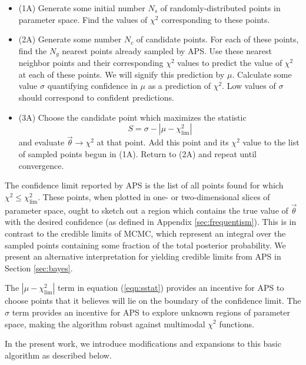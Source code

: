 \documentclass[useAMS,usenatbib]{aastex}
\begin{document}
\begin{itemize}
\item(1A) Generate some initial number $N_s$ of randomly-distributed points in 
parameter space.  Find the values of $\chi^2$ corresponding to these points.
\\
\item(2A) Generate some number $N_c$ of candidate points.  
For each of these points, find the $N_g$ nearest points already sampled
by APS. Use these nearest neighbor points and their corresponding $\chi^2$ values
to predict the value of $\chi^2$ at each of these points.
 We will signify this prediction by $\mu$.  Calculate some value $\sigma$
 quantifying confidence in $\mu$ as a prediction of $\chi^2$.  Low values of
 $\sigma$ should correspond to confident predictions.
 \\
\item(3A) Choose the candidate point which maximizes the statistic
\begin{equation}
\label{eqn:sstat}
S=\sigma-|\mu-\chi^2_\text{lim}|
\end{equation}
and evaluate $\vec{\theta}\rightarrow\chi^2$ at that point.  Add this point and
its $\chi^2$ value to the list of sampled points begun in (1A). 
Return to (2A) and repeat until convergence.
\\
\end{itemize}
The confidence limit reported by APS is the list of all points found
for which $\chi^2\le\chi^2_\text{lim}$.  
These points, when plotted in one- or two-dimensional slices of parameter
space, ought to sketch out a region which contains the true value of $\vec{\theta}$
with the desired confidence (as defined in Appendix \ref{sec:frequentism}).
This is in contrast to the credible
limits of MCMC, which represent an integral over the sampled points containing some
fraction of the total posterior probability.  We present an alternative
interpretation for yielding credible limits from APS in Section \ref{sec:bayes}.

The $|\mu-\chi^2_\text{lim}|$ term in equation (\ref{eqn:sstat}) provides an
incentive for APS to choose points that it believes will lie on the boundary of
the confidence limit.  
The $\sigma$ term provides an incentive for APS to explore unknown regions of
parameter space, making the algorithm robust against multimodal $\chi^2$
functions.  

In the present work, we introduce modifications and expansions to this basic algorithm as
described below.
\end{document}
